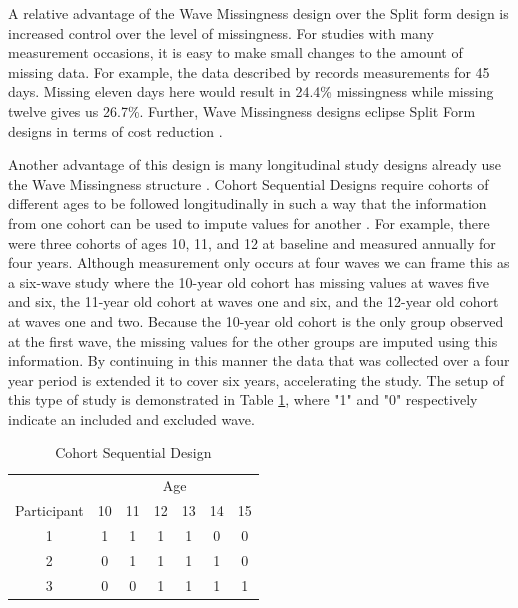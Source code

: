 \documentclass{svjour3}\usepackage[]{graphicx}\usepackage[]{color}
\begin{document}
A relative advantage of the Wave Missingness design over the Split form design is increased control over the level of missingness. For studies with many measurement occasions, it is easy to make small changes to the amount of missing data. For example, the data described by \citet{pellowski2016alcohol} records measurements for 45 days. Missing eleven days here would result in 24.4\% missingness while missing twelve gives us 26.7\%. Further, Wave Missingness designs eclipse Split Form designs in terms of cost reduction \citep{little2013planned}. \par

Another advantage of this design is many longitudinal study designs already use the Wave Missingness structure \citep{little2013planned}. Cohort Sequential Designs require cohorts of different ages to be followed longitudinally in such a way that the information from one cohort can be used to impute values for another \citep{little2013longitudinal, duncan2013introduction}. For example, there were three cohorts of ages 10, 11, and 12 at baseline and measured annually for four years. Although measurement only occurs at four waves we can frame this as a six-wave study where the 10-year old cohort has missing values at waves five and six, the 11-year old cohort at waves one and six, and the 12-year old cohort at waves one and two. Because the 10-year old cohort is the only group observed at the first wave, the missing values for the other groups are imputed using this information. By continuing in this manner the data that was collected over a four year period is extended it to cover six years, accelerating the study. The setup of this type of study is demonstrated in Table \ref{tab:cohort}, where "1" and "0" respectively indicate an included and excluded wave. \par

\begin{table}[H]
	\centering
	\caption{Cohort Sequential Design}
	\label{tab:cohort}
	\setlength{\tabcolsep}{0.5cm}
	\begin{tabular}{c|cccccc}
		\toprule
		& \multicolumn{6}{c}{Age} \\
		Participant & 10 & 11 & 12 & 13 & 14 & 15 \\
		\midrule
		1 & 1 & 1 & 1 & 1 & 0 & 0\\
		2 & 0 & 1 & 1 & 1 & 1 & 0\\
		3 & 0 & 0 & 1 & 1 & 1 & 1\\
		\bottomrule
	\end{tabular}
\end{table}
\end{document}
